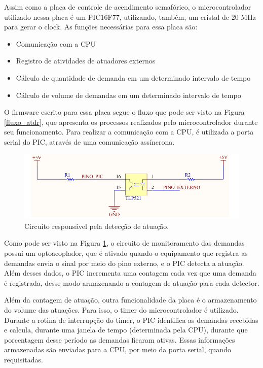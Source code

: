 Assim como a placa de controle de acendimento semafórico, o microcontrolador utilizado nessa placa é um PIC16F77, utilizando, também, um cristal de 20 MHz para gerar o clock. As funções necessárias para essa placa são:

\begin{itemize}
\item Comunicação com a CPU
\item Registro de atividades de atuadores externos
\item Cálculo de quantidade de demanda em um determinado intervalo de tempo
\item Cálculo de volume de demandas em um determinado intervalo de tempo
\end{itemize}

O firmware escrito para essa placa segue o fluxo que pode ser visto na Figura \ref{fluxo_atdr}, que apresenta os processos realizados pelo microcontrolador durante seu funcionamento. Para realizar a comunicação com a CPU, é utilizada a porta serial do PIC, através de uma comunicação assíncrona. 

\begin{figure}[ht]
    \begin{center}
    \includegraphics{figuras/atuacao.PNG}
    \end{center}
    \caption[Circuito de atuador]{Circuito responsável pela detecção de atuação.}
    \label{atdr}
\end{figure}

Como pode ser visto na Figura \ref{atdr}, o circuito de monitoramento das demandas possui um optoacoplador, que é ativado quando o equipamento que registra as demandas envia o sinal por meio do pino externo, e o PIC detecta a atuação. Além desses dados, o PIC incrementa uma contagem cada vez que uma demanda é registrada, desse modo armazenando a contagem de atuação para cada detector.

Além da contagem de atuação, outra funcionalidade da placa é o armazenamento do volume das atuações. Para isso, o timer do microcontrolador é utilizado. Durante a rotina de interrupção do timer, o PIC identifica as demandas recebidas e calcula, durante uma janela de tempo (determinada pela CPU), durante que porcentagem desse período as demandas ficaram ativas. Essas informações armazenadas são enviadas para a CPU, por meio da porta serial, quando requisitadas.


